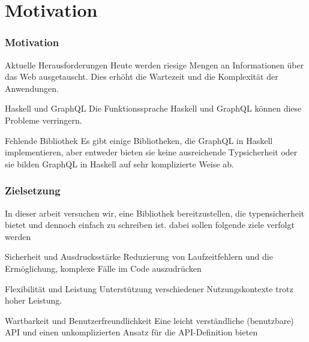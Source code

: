 
\section{Motivation}

\begin{frame}{}
    \frametitle{Motivation}

    \footnotesize

    \begin{alertblock}{Aktuelle Herausforderungen}
        Heute werden riesige Mengen an Informationen über das Web ausgetauscht. Dies erhöht die \alert{Wartezeit} und die \alert{Komplexität} der Anwendungen. 
    \end{alertblock}

    \begin{alertblock}{Haskell und  GraphQL}
        Die Funktionssprache Haskell und GraphQL können diese Probleme verringern.
    \end{alertblock}

    \begin{block}{Fehlende Bibliothek}
        Es gibt einige Bibliotheken, die GraphQL in Haskell implementieren, aber entweder bieten sie keine ausreichende Typsicherheit oder sie bilden GraphQL in Haskell auf sehr komplizierte Weise ab. 
    \end{block}

\end{frame}

\begin{frame}
    \frametitle{Zielsetzung}

    In dieser arbeit versuchen wir, eine Bibliothek bereitzustellen,
    die \alert{typensicherheit bietet} und dennoch \alert{einfach zu schreiben} ist. 
    dabei sollen folgende ziele verfolgt werden

        \footnotesize
        \begin{alertblock}{Sicherheit und Ausdrucksstärke}
            Reduzierung von Laufzeitfehlern und die Ermöglichung, komplexe Fälle im Code auszudrücken
        \end{alertblock}

        \begin{alertblock}{Flexibilität und Leistung} 
            Unterstützung verschiedener Nutzungskontexte trotz hoher Leistung. 
        \end{alertblock}

        \begin{alertblock}{Wartbarkeit und Benutzerfreundlichkeit} 
            Eine leicht verständliche (benutzbare) API und einen unkomplizierten Ansatz für die API-Definition bieten 
        \end{alertblock}
\end{frame}

